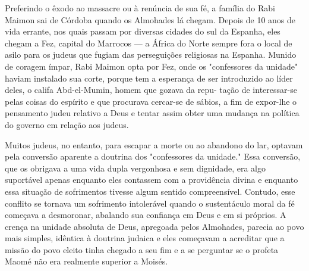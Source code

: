 Preferindo o êxodo ao massacre ou à renúncia de sua fé, a família do
Rabi Maimon sai de Córdoba quando os Almohades lá chegam. Depois de 10
anos de vida errante, nos quais passam por diversas cidades do sul da
Espa­nha, eles chegam a Fez, capital do Marrocos --- a África do Norte
sempre fora o local de asilo para os judeus que fugiam das perseguições
religiosas na Espa­nha. Munido de coragem ímpar, Rabi Maimon opta por
Fez, onde os "confes­sores da unidade" haviam instalado sua corte,
porque tem a esperança de ser introduzido ao líder deles, o califa
Abd-el-Mumin, homem que gozava da repu-
tação de interessar-se pelas coisas do espírito e que procurava
cercar-se de sá­bios, a fim de expor-lhe o pensamento judeu relativo a
Deus e tentar assim ob­ter uma mudança na política do governo em relação
aos judeus.

Muitos judeus, no entanto, para escapar a morte ou ao abandono do lar,
optavam pela conversão aparente a doutrina dos "confessores da
unida­de." Essa conversão, que os obrigava a uma vida dupla vergonhosa e
sem dig­nidade, era algo suportável apenas enquanto eles contassem com a
providência divina e enquanto essa situação de sofrimentos tivesse algum
sentido compreen­sível. Contudo, esse conflito se tornava um sofrimento
intolerável quando o sustentáculo moral da fé começava a desmoronar,
abalando sua confiança em Deus e em si próprios. A crença na unidade
absoluta de Deus, apregoada pelos Almohades, parecia ao povo mais
simples, idêntica à doutrina judaica e eles co­meçavam a acreditar que a
missão do povo eleito tinha chegado a seu fim e a se perguntar se o
profeta Maomé não era realmente superior a Moisés.

